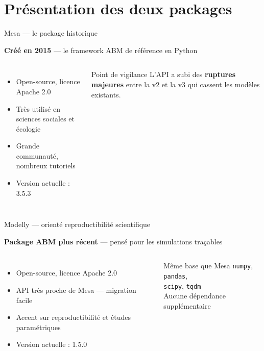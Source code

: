 \documentclass[aspectratio=169, 11pt]{beamer}
\begin{document}
\section{Présentation des deux packages}

\begin{frame}{Mesa — le package historique}

  \textbf{Créé en 2015} — le framework ABM de référence en Python

  \bigskip

  \begin{columns}[T]
      \begin{itemize}\setlength\itemsep{6pt}
        \item Open-source, licence Apache 2.0
        \item Très utilisé en sciences sociales et écologie
        \item Grande communauté, nombreux tutoriels
        \item Version actuelle : 3.5.3
      \end{itemize}

      \begin{alertblock}{Point de vigilance}
        L'API a subi des \textbf{ruptures majeures} entre la v2 et la v3 qui cassent les modèles existants.
      \end{alertblock}
  \end{columns}

\end{frame}

\begin{frame}{Modelly — orienté reproductibilité scientifique}

  \textbf{Package ABM plus récent} — pensé pour les simulations traçables

  \bigskip

  \begin{columns}[T]
      \begin{itemize}\setlength\itemsep{6pt}
        \item Open-source, licence Apache 2.0
        \item API très proche de Mesa — migration facile
        \item Accent sur reproductibilité et études paramétriques
        \item Version actuelle : 1.5.0
      \end{itemize}

      \begin{block}{Même base que Mesa}
        \texttt{numpy}, \texttt{pandas},\\
        \texttt{scipy}, \texttt{tqdm}\\
        \medskip
        Aucune dépendance\\supplémentaire
      \end{block}
  \end{columns}

\end{frame}
\end{document}
